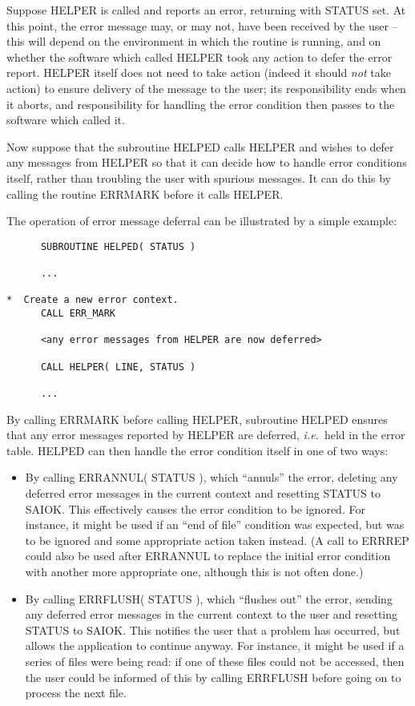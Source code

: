 \documentclass[twoside,11pt]{article}
\renewcommand{\_}{\texttt{\symbol{95}}}
\begin{document}
Suppose HELPER is called and reports an error, returning with STATUS set.
At this point, the error message may, or may not, have been received by the
user -- this will depend on the environment in which the routine is running,
and on whether the software which called HELPER took any action to defer the
error report. 
HELPER itself does not need to take action (indeed it should \emph{not} take 
action) to ensure delivery of the message to the user; its responsibility 
ends when it aborts, and responsibility for handling the error condition then
passes to the software which called it. 

Now suppose that the subroutine HELPED calls HELPER and wishes to defer any
messages from HELPER so that it can decide how to handle error conditions
itself, rather than troubling the user with spurious messages. 
It can do this by calling the routine ERR\_MARK before it calls HELPER.

The operation of error message deferral can be illustrated by a simple
example:

\begin {small}
\begin{verbatim}
      SUBROUTINE HELPED( STATUS )

      ...

*  Create a new error context.
      CALL ERR_MARK

      <any error messages from HELPER are now deferred>

      CALL HELPER( LINE, STATUS )

      ...
\end{verbatim}
\end {small}

By calling ERR\_MARK before calling HELPER, subroutine HELPED ensures that any
error  messages reported by HELPER are deferred, \textit{i.e.}\ held in the error table.
HELPED can then handle the error condition itself in one of two ways:

\begin {itemize}
\item By calling ERR\_ANNUL( STATUS ), which ``annuls'' the error, deleting 
any deferred error messages in the current context and resetting STATUS to 
SAI\_\_OK.
This effectively causes the error condition to be ignored.
For instance, it might be used if an ``end of file'' condition was expected, 
but was to be ignored and some appropriate action taken instead.
(A call to ERR\_REP could also be used after ERR\_ANNUL to replace the 
initial error condition with another more appropriate one, although this is
not often done.) 

\item By calling ERR\_FLUSH( STATUS ), which ``flushes out'' the error, 
sending any deferred error messages in the current context to the user and
resetting STATUS to SAI\_\_OK. 
This notifies the user that a problem has occurred, but allows the 
application to continue anyway.
For instance, it might be used if a series of files were being read: if one
of these files could not be accessed, then the user could be informed of
this by calling ERR\_FLUSH before going on to process the next file. 
\end{itemize}
\end{document}
